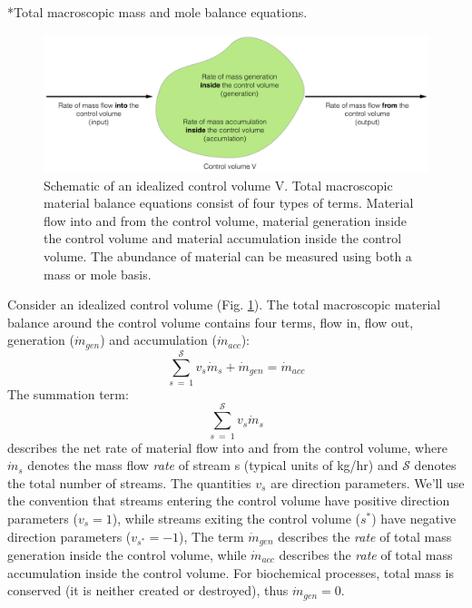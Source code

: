 \documentclass[11pt]{article}
\makeatletter
\theoremstyle{definition}
\renewcommand\subsection{\@startsection
	{subsection}{2}{0mm}
	{-0.05in}
	{-0.5\baselineskip}
	{\normalfont\normalsize\bfseries}}
\makeatother
\begin{document}
\subsection*{Total macroscopic mass and mole balance equations.}
\begin{figure}[!ht]\centering
\includegraphics[width=1.0\textwidth]{./figs/Control-Volume.pdf}
\caption{Schematic of an idealized control volume V. Total macroscopic material balance equations consist of four types of terms.
Material flow into and from the control volume, material generation inside the control volume and material accumulation inside the control volume.
The abundance of material can be measured using both a mass or mole basis.}\label{fig-control-volume}
\end{figure}

Consider an idealized control volume (Fig. \ref{fig-control-volume}).
The total macroscopic material balance around the control volume contains four terms, flow in, flow out, generation ($\dot{m}_{gen}$) and accumulation ($\dot{m}_{acc}$):
\begin{equation}\label{eqn-total-mass}
	\sum_{s~=~1}^{\mathcal{S}}v_{s}\dot{m}_{s} + \dot{m}_{gen} = \dot{m}_{acc}
\end{equation}
The summation term:
\begin{equation}
\sum_{s~=~1}^{\mathcal{S}}v_{s}\dot{m}_{s}
\end{equation}
describes the net rate of material flow into and from the control volume, where $\dot{m}_{s}$ denotes the mass flow
\emph{rate} of stream s (typical units of kg/hr) and $\mathcal{S}$ denotes the total number of streams. The quantities
$v_{s}$ are direction parameters. We'll use the convention that streams entering the control volume have
positive direction parameters ($v_{s} = 1$), while streams exiting the control volume ($s^{*}$) have negative direction parameters ($v_{s^{*}} = -1$),
The term $\dot{m}_{gen}$ describes the \emph{rate} of total mass generation inside the control volume,
while $\dot{m}_{acc}$  describes the \emph{rate} of total mass accumulation inside the control volume.
For biochemical processes, total mass is conserved (it is neither created or destroyed), thus $\dot{m}_{gen} = 0$.
\end{document}
